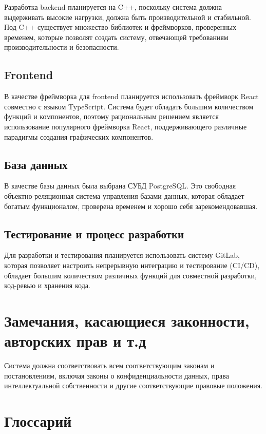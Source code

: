 \documentclass[a4paper, 14pt]{extarticle}
\begin{document}
Разработка backend планируется на C++, поскольку система должна выдерживать
высокие нагрузки, должна быть производительной и стабильной. Под C++ существует
множество библиотек и фреймворков, проверенных временем, которые позволят
создать систему, отвечающей требованиям производительности и безопасности.

\subsection*{Frontend}

В качестве фреймворка для frontend планируется использовать фреймворк React
совместно с языком TypeScript. Система будет обладать большим количеством
функций и компонентов, поэтому рациональным решением является использование
популярного фреймворка React, поддерживающего различные парадигмы создания
графических компонентов.

\subsection*{База данных}

В качестве базы данных была выбрана СУБД PostgreSQL. Это свободная
объектно-реляционная система управления базами данных, которая обладает богатым
функционалом, проверена временем и хорошо себя зарекомендовавшая.

\subsection*{Тестирование и процесс разработки}

Для разработки и тестирования планируется использовать систему GitLab, которая
позволяет настроить непрерывную интеграцию и тестирование (CI/CD), обладает
большим количеством различных функций для совместной разработки, код-ревью и
хранения кода.

\section{Замечания, касающиеся законности, авторских прав и т.д}

Система должна соответствовать всем соответствующим законам и постановлениям,
включая законы о конфиденциальности данных, права интеллектуальной собственности
и другие соответствующие правовые положения.

\newpage

\section{Глоссарий}
\end{document}
